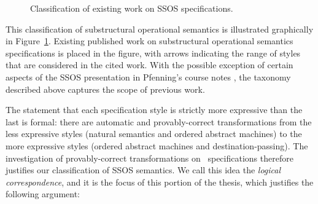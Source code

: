 \begin{figure}
\begin{center}
\end{center}
\caption{Classification of existing work on SSOS specifications.}
\label{fig:class-prevwork}
\end{figure}

This classification of substructural operational semantics is
illustrated graphically in Figure~\ref{fig:class-prevwork}. Existing
published work on substructural operational semantics specifications
is placed in the figure, with arrows indicating the range of styles
that are considered in the cited work.  With the possible exception of
certain aspects of the SSOS presentation in Pfenning's course notes
\cite{pfenning12substructural}, the taxonomy described above captures
the scope of previous work.

The statement that each specification style is strictly more
expressive than the last is formal: there are automatic and
provably-correct transformations from the less expressive styles
(natural semantics and ordered abstract machines) to the more
expressive styles (ordered abstract machines and destination-passing).
The investigation of provably-correct transformations on
\sls~specifications therefore justifies our classification of SSOS
semantics. We call this idea the {\it logical correspondence}, and it
is the focus of this portion of the thesis, which justifies the
following argument:

